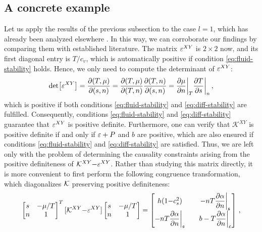 \documentclass[
a4paper,
amsfonts,
amsmath,
reprint,
showkeys,
nofootinbib,
twoside,
onecolumn,
notitlepage
]{revtex4-1}
\begin{document}
	\subsection{A concrete example}
	
	Let us apply the results of the previous subsection to the case $l=1$, which has already been analyzed elsewhere \cite{Hishcock1983,OlsonLifsh1990,OlsonRegular1990}. 
 In this way, we can corroborate our findings by comparing them with established literature.
	The matrix $\varepsilon^{XY}$ is $2{\times}2$ now, and its first diagonal entry is $T/c_v$, which is automatically positive if condition \eqref{eq:fluid-stability} holds.
	Hence, we only need to compute the determinant of $\varepsilon^{XY}$:
	\begin{equation}
		\det[\varepsilon^{XY}]= \dfrac{\partial(T,\mu)}{\partial(s,n)} = \dfrac{\partial(T,\mu)}{\partial(T,n)} \dfrac{\partial(T,n)}{\partial(s,n)} = \dfrac{\partial \mu}{\partial n}\bigg|_T \dfrac{\partial T}{\partial s}\bigg|_n \,,
	\end{equation}
	which is positive if both conditions \eqref{eq:fluid-stability} and \eqref{eq:diff-stability} are fulfilled.
	Consequently, conditions \eqref{eq:fluid-stability} and \eqref{eq:diff-stability} guarantee that $\varepsilon^{XY}$ is positive definite. 
	Furthermore, one can verify that $\mathcal{K}^{XY}$ is positive definite if and only if $\varepsilon+P$ and $b$ are positive, which are also ensured if conditions \eqref{eq:fluid-stability} and \eqref{eq:diff-stability} are satisfied.
	Thus, we are left only with the problem of determining the causality constraints arising from the positive definiteness of $\mathcal{K}^{XY}{-}\varepsilon^{XY}$. 
	Rather than studying this matrix directly, it is more convenient to first perform the following congruence transformation, which diagonalizes ${\mathcal{K}}$ preserving positive definiteness:
	\begin{equation}\label{eq:awry}
		\begin{bmatrix}
			s & -\mu/T \\
			n &  1 \\
		\end{bmatrix}^T
		[\mathcal{K}^{XY}{-}\varepsilon^{XY}]
		\begin{bmatrix}
			s & -\mu/T \\
			n &  1 \\
		\end{bmatrix}
		=
		\begin{bmatrix}
			h(1{-}c_s^2) & & -nT \dfrac{\partial \alpha}{\partial n}\bigg|_{\mathfrak{s}} \\[7pt]
			-nT \dfrac{\partial \alpha}{\partial n}\bigg|_{\mathfrak{s}} & & b-T \dfrac{\partial \alpha}{\partial n}\bigg|_{\varepsilon}\\[7pt]
		\end{bmatrix}\,,
	\end{equation}
\end{document}
